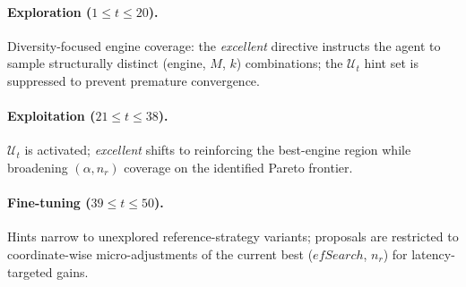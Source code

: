 \documentclass[sigconf, nonacm]{acmart}
\theoremstyle{definition}
\begin{document}
\paragraph{Exploration ($1 \leq t \leq 20$).}
Diversity-focused engine coverage: the \textit{excellent} directive instructs the agent
to sample structurally distinct (engine, $M$, $k$) combinations;
the $\mathcal{U}_t$ hint set is suppressed to prevent premature convergence.
\paragraph{Exploitation ($21 \leq t \leq 38$).}
$\mathcal{U}_t$ is activated; \textit{excellent} shifts to reinforcing the best-engine
region while broadening $(\alpha, n_r)$ coverage on the identified Pareto frontier.
\paragraph{Fine-tuning ($39 \leq t \leq 50$).}
Hints narrow to unexplored reference-strategy variants; proposals are restricted to
coordinate-wise micro-adjustments of the current best
($\mathit{efSearch}$, $n_r$) for latency-targeted gains.
\end{document}

